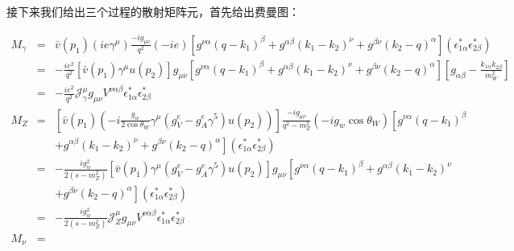 \documentclass{article}
\begin{document}
接下来我们给出三个过程的散射矩阵元，首先给出费曼图：
\begin{center}
\end{center}
\begin{eqnarray}
    M_\gamma &=& \bar{v}(p_1)(ie\gamma^\mu)\frac{-ig_{\mu\nu}}{q^2}(-ie)\left[g^{\nu\alpha}(q - k_1)^\beta + g^{\alpha\beta}(k_1 - k_2)^\nu + g^{\beta\nu}(k_2 - q)^\alpha\right]\left(\epsilon_{1\alpha}^* \epsilon_{2\beta}^*\right) \nonumber \\
    &=& -\frac{ie^2}{q^2}\left[\bar{v}(p_1)\gamma^\mu u(p_2)\right]g_{\mu\nu}\left[g^{\nu\alpha}(q - k_1)^\beta + g^{\alpha\beta}(k_1 - k_2)^\nu + g^{\beta\nu}(k_2 - q)^\alpha\right]\left[g_{\alpha\beta} - \frac{k_{1\alpha}k_{2\beta}}{m_W^2}\right] \nonumber \\
    &=& -\frac{ie^2}{q^2} \mathcal{J}_{\gamma}^{\mu}g_{\mu\nu}V^{\nu\alpha\beta}\epsilon_{1\alpha}^* \epsilon_{2\beta}^* \nonumber \\
    M_Z &=& \left[\bar{v}(p_1)\left(-i\frac{g_w}{2\cos{\theta_W}} \gamma^\mu \left(g_V^e - g_A^e \gamma^5\right) u(p_2)\right)\right]\frac{-ig_{\mu\nu}}{q^2 - m_Z^2}(-ig_w \cos{\theta_W})\left[g^{\nu\alpha}(q - k_1)^\beta \right. \nonumber \\
    && \left.+ g^{\alpha\beta}(k_1 - k_2)^\nu + g^{\beta\nu}(k_2 - q)^\alpha\right]\left(\epsilon_{1\alpha}^* \epsilon_{2\beta}^*\right) \nonumber \\
    &=& -\frac{i g_w^2}{2\left(s - m_Z^2\right)}\left[\bar{v}(p_1)\gamma^\mu \left(g_V^e - g_A^e \gamma^5\right) u(p_2)\right]g_{\mu\nu} \left[g^{\nu\alpha}(q - k_1)^\beta + g^{\alpha\beta}(k_1 - k_2)^\nu \right. \nonumber \\
    && \left.+ g^{\beta\nu}(k_2 - q)^\alpha\right]\left(\epsilon_{1\alpha}^* \epsilon_{2\beta}^*\right) \nonumber \\
    &=& -\frac{i g_w^2}{2\left(s - m_Z^2\right)}\mathcal{J}_{Z}^{\mu}g_{\mu\nu}V^{\nu\alpha\beta}\epsilon_{1\alpha}^* \epsilon_{2\beta}^* \nonumber \\
    M_\nu &=& \nonumber
\end{eqnarray}
\end{document}
